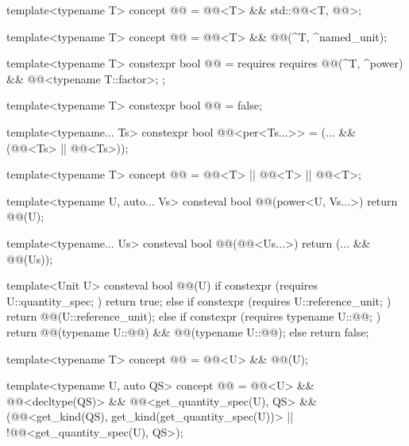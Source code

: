\begin{itemdecl}
template<typename T>
concept @@ = @@<T> && std::@@<T, @@>;

template<typename T>
concept @@ = @@<T> && @@(^T, ^named_unit);

template<typename T>
constexpr bool @@ = requires {
  requires @@(^T, ^power) && @@<typename T::factor>;
};

template<typename T>
constexpr bool @@ = false;

template<typename... Ts>
constexpr bool @@<per<Ts...>> = (... && (@@<Ts> || @@<Ts>));

template<typename T>
concept @@ = @@<T> || @@<T> || @@<T>;

template<typename U, auto... Vs>
consteval bool @@(power<U, Vs...>)
{
  return @@(U{});
}

template<typename... Us>
consteval bool @@(@@<Us...>)
{
  return (... && @@(Us{}));
}

template<Unit U>
consteval bool @@(U)
{
  if constexpr (requires { U::quantity_spec; })
    return true;
  else if constexpr (requires { U::reference_unit; })
    return @@(U::reference_unit);
  else if constexpr (requires { typename U::@@; })
    return @@(typename U::@@{}) &&
           @@(typename U::@@{});
  else
    return false;
}

template<typename T>
concept @@ = @@<U> && @@(U{});

template<typename U, auto QS>
concept @@ = @@<U> && @@<decltype(QS)> &&
                 @@<get_quantity_spec(U{}), QS> &&
                 (@@<get_kind(QS), get_kind(get_quantity_spec(U{}))> ||
                  !@@<get_quantity_spec(U{}), QS>);


\end{itemdecl}
